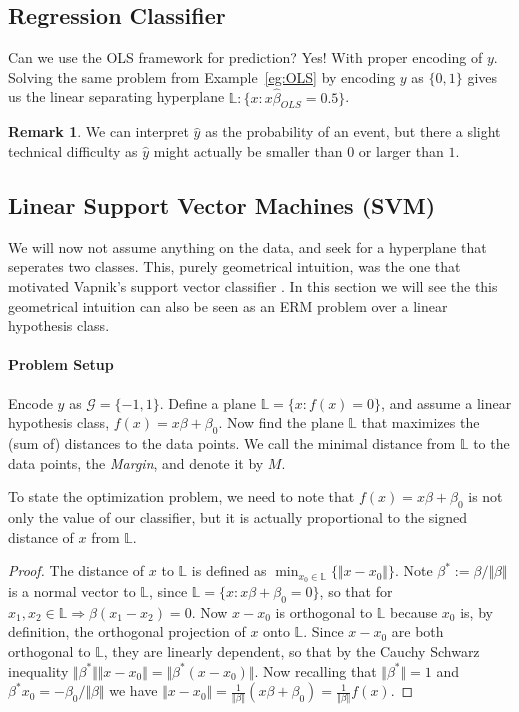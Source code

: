 \documentclass[12pt,a4paper]{article}
\theoremstyle{plain}
\theoremstyle{definition}
\newtheorem{remark}{Remark}
\newcommand{\norm}[1]{\Vert #1 \Vert}
\newcommand{\hyp}{f}
\newcommand{\plane}{\mathbb{L}}
\newcommand{\categories}{\mathcal{G}}
\begin{document}
\subsection{Regression Classifier}
\label{sec:regression_classifier}
Can we use the OLS framework for prediction? Yes! With proper encoding of $y$.
Solving the same problem from Example~\ref{eg:OLS} by encoding $y$ as $\{0,1\}$ gives us the linear separating hyperplane $\plane: \{x:x\hat{\beta}_{OLS}=0.5\}$.

\begin{remark}
We can interpret $\hat{y}$ as the probability of an event, but there a slight technical difficulty as $\hat{y}$ might actually be smaller than $0$ or larger than $1$.
\end{remark}


\subsection{Linear Support Vector Machines (SVM)}
We will now not assume anything on the data, and seek for a hyperplane that seperates two classes.
This, purely geometrical intuition, was the one that motivated Vapnik's support vector classifier \citep{vapnik_statistical_1998}.
In this section we will see the this geometrical intuition can also be seen as an ERM problem over a linear hypothesis class.

\paragraph{Problem Setup}
Encode $y$ as $\categories=\{-1,1\}$.
Define a plane $\plane=\{x: \hyp(x)=0 \}$, and assume a linear hypothesis class, $\hyp(x)=x\beta+\beta_0$.
Now find the plane $\plane$ that maximizes the (sum of) distances to the data points.
We call the minimal distance from $\plane$ to the data points, the \emph{Margin}, and denote it by $M$.

To state the optimization problem, we need to note that $\hyp(x)=x\beta+\beta_0$ is not only the value of our classifier, but it is actually proportional to the signed distance of $x$ from $\plane$. 
\begin{proof}
The distance of $x$ to $\plane$ is defined as $\min_{x_0 \in \plane} \{ \norm{x-x_0} \}$.
Note $\beta^*:=\beta/\norm{\beta}$ is a normal vector to $\plane$, since $\plane=\{x: x\beta+\beta_0=0 \}$, so that for $x_1,x_2 \in \plane \Rightarrow \beta(x_1-x_2)=0$.
Now $x-x_0$ is orthogonal to $\plane$ because $x_0$ is, by definition, the orthogonal projection of $x$ onto $\plane$.
Since $x-x_0$ are both orthogonal to $\plane$, they are linearly dependent, so that by the Cauchy Schwarz inequality $\norm{\beta^*} \norm{x-x_0}= \norm{\beta^*(x-x_0)}$.
Now recalling that $\norm{\beta^*}=1$ and $\beta^* x_0=-\beta_0/\norm{\beta}$ we have $\norm{x-x_0}=\frac{1}{\norm{\beta}} (x\beta+\beta_0)= \frac{1}{\norm{\beta}} \hyp(x)$.
\end{proof}
\end{document}
